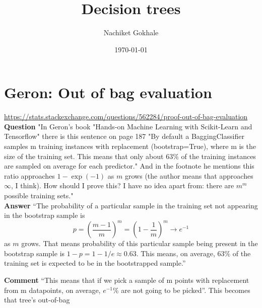 \documentclass{article}
\begin{document}
\title{Decision trees}
\author{Nachiket Gokhale}
\date{\today}
\maketitle
\section{Geron: Out of bag evaluation}
\url{https://stats.stackexchange.com/questions/562284/proof-out-of-bag-evaluation}
\textbf{Question} "In Geron's book "Hands-on Machine Learning with Scikit-Learn and Tensorflow" there is this sentence on page 187 "By default a BaggingClassifier samples m training instances with replacement (bootstrap=True), where m is the size of the training set. This means that only about 63\% of the training instances are sampled on average for each predictor."  And in the footnote he mentions this ratio approaches $1-\exp(-1)$ as $m$ grows (the author means that approaches $\infty$, I think). How should I prove this? I have no idea apart from: there are $m^m$ possible training sets."\\
\textbf{Answer} ``The probability of a particular sample in the training set not appearing in the bootstrap sample is 
$$p=\left(\frac{m-1}{m}\right)^m=\left(1-\frac{1}{m}\right)^m\rightarrow e^{-1}$$ as $m$ grows. That means probability of this particular sample being present in the bootstrap sample is $1-p=1-1/e\approx 0.63$. This means, on average, $63\%$ of the training set is expected to be in the bootstrapped sample.''

\textbf{Comment} ``This means that if we pick a sample of m points with replacement from m datapoints, on average, $e^{-1}$\% are not going to be picked''. This becomes that tree's out-of-bag
\end{document}
